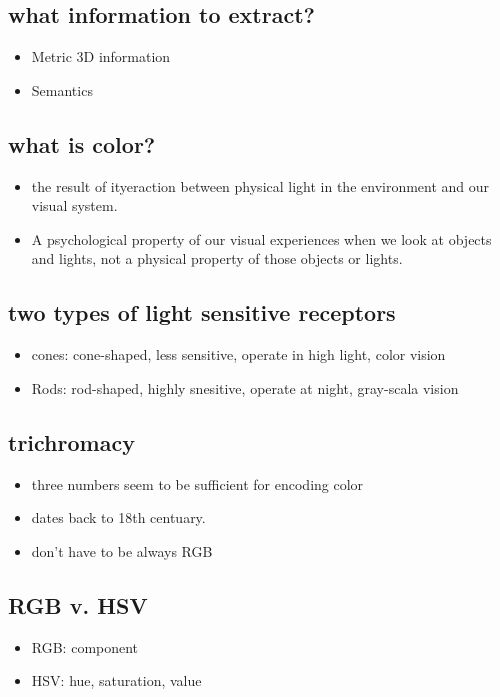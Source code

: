 \documentclass[11pt]{article}
\begin{document}
\subsection{what information to extract?}
\label{sec:org237b84f}
\begin{itemize}
\item Metric 3D information
\item Semantics
\end{itemize}
\subsection{what is color?}
\label{sec:orga618740}
\begin{itemize}
\item the result of ityeraction between physical light in the environment and our visual system.
\item A psychological property of our visual experiences when we look at objects and lights, not a physical property of those objects or lights.
\end{itemize}
\subsection{two types of light sensitive receptors}
\label{sec:orgd59f894}
\begin{itemize}
\item cones: cone-shaped, less sensitive, operate in high light, color vision
\item Rods: rod-shaped, highly snesitive, operate at night, gray-scala vision
\end{itemize}
\subsection{trichromacy}
\label{sec:org3130cc2}
\begin{itemize}
\item three numbers seem to be sufficient for encoding color
\item dates back to 18th centuary.
\item don't have to be always RGB
\end{itemize}
\subsection{RGB v. HSV}
\label{sec:orgdd85f80}
\begin{itemize}
\item RGB: component
\item HSV: hue, saturation, value
\end{itemize}
\end{document}
